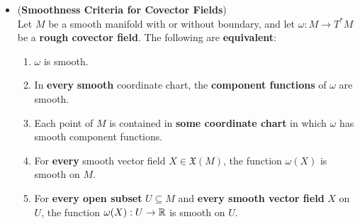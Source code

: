 \documentclass[11pt]{article}
\begin{document}
\begin{itemize}
\item 
\begin{proposition} (\textbf{Smoothness Criteria for Covector Fields}) \citep{lee2003introduction} \\
Let $M$ be a smooth manifold with or without boundary, and let $\omega: M \rightarrow T^{*}M$ be a \textbf{rough covector field}. The following are \textbf{equivalent}:
\begin{enumerate}
\item $\omega$ is smooth.
\item In \textbf{every} \textbf{smooth} coordinate chart, the \textbf{component functions} of $\omega$ are smooth.
\item Each point of $M$ is contained in \textbf{some coordinate chart} in which $\omega$ has smooth component functions.
\item For \textbf{every} smooth vector field $X \in \mathfrak{X}(M)$, the function $\omega(X)$ is smooth on $M$.
\item For \textbf{every open subset} $U \subseteq M$ and \textbf{every smooth vector field} $X$ on $U$, the function $\omega(X): U \rightarrow {\mathbb R}$ is smooth on $U$.
\end{enumerate}
\end{proposition}
\end{itemize}
\end{document}
